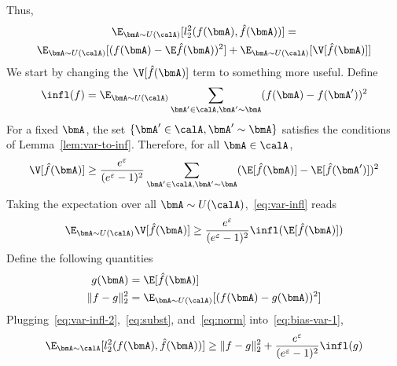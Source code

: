 Thus, 
\begin{multline}\label{eq:bias-var-1}
  \E_{\bmA \sim U(\calA)}[l_2^2(f(\bmA),\hat{f}(\bmA))] = \\ \E_{\bmA \sim
  U(\calA)}[(f(\bmA) - \E\hat{f}(\bmA))^2] + \E_{\bmA \sim
  U(\calA)}[\V[\hat{f}(\bmA)]]
\end{multline}
We start by changing the $\V[\hat{f}(\bmA)]$ term to something more useful. Define
\[
    \infl(f) = \E_{\bmA \sim U(\calA)} \sum_{\bmA' \in \calA, \bmA' \sim \bmA} (f(\bmA) - f(\bmA'))^2
\]
For a fixed $\bmA$, the set $\{\bmA' \in \calA, \bmA' \sim \bmA\}$ satisfies the conditions of Lemma~\ref{lem:var-to-inf}. Therefore, for all $\bmA \in \calA$, 
\begin{equation}\label{eq:var-infl}
\V[\hat{f}(\bmA)] \geq \frac{e^\varepsilon}{(e^\varepsilon-1)^2} \sum_{\bmA' \in \calA, \bmA' \sim \bmA} (\E[\hat{f}(\bmA)] - \E[\hat{f}(\bmA')])^2
\end{equation}
Taking the expectation over all $\bmA \sim U(\calA)$,~\eqref{eq:var-infl} reads 
\begin{equation}\label{eq:var-infl-2}
    \E_{\bmA \sim U(\calA)} \V[\hat{f}(\bmA)] \geq \frac{e^\varepsilon}{(e^\varepsilon-1)^2} \infl(\E[\hat{f}(\bmA)])
\end{equation}
Define the following quantities
\begin{align}
    g(\bmA) &= \E[\hat{f}(\bmA)] \label{eq:subst} \\
    \|f-g\|_2^2 &= \E_{\bmA \sim U(\calA)}[(f(\bmA) - g(\bmA))^2] \label{eq:norm}
\end{align}
Plugging~\eqref{eq:var-infl-2},~\eqref{eq:subst}, and~\eqref{eq:norm} into~\eqref{eq:bias-var-1},
\begin{equation}\label{eq:bias-var-3}
  \E_{\bmA \sim \calA}[l_2^2(f(\bmA), \hat{f}(\bmA))] \geq \|f-g\|_2^2  +
  \frac{e^\varepsilon}{(e^\varepsilon-1)^2} \infl(g)
\end{equation}

